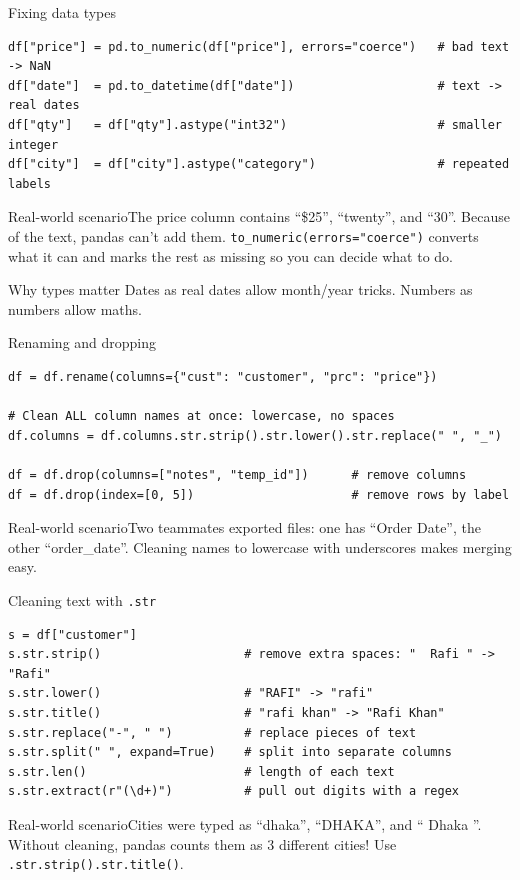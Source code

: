 \documentclass[aspectratio=169,10pt]{beamer}
\newcommand{\code}[1]{\texttt{#1}}
\newcommand{\scenario}[1]{\begin{exampleblock}{Real-world scenario}#1\end{exampleblock}}
\begin{document}
\begin{frame}[fragile]{Fixing data types}
\begin{lstlisting}
df["price"] = pd.to_numeric(df["price"], errors="coerce")   # bad text -> NaN
df["date"]  = pd.to_datetime(df["date"])                    # text -> real dates
df["qty"]   = df["qty"].astype("int32")                     # smaller integer
df["city"]  = df["city"].astype("category")                 # repeated labels
\end{lstlisting}
  \scenario{The price column contains ``\$25'', ``twenty'', and ``30''. Because of the text,
  pandas can't add them. \code{to\_numeric(errors="coerce")} converts what it can and marks
  the rest as missing so you can decide what to do.}
  \begin{block}{Why types matter}
    Dates as real dates allow month/year tricks. Numbers as numbers allow maths.
  \end{block}
\end{frame}

\begin{frame}[fragile]{Renaming and dropping}
\begin{lstlisting}
df = df.rename(columns={"cust": "customer", "prc": "price"})

# Clean ALL column names at once: lowercase, no spaces
df.columns = df.columns.str.strip().str.lower().str.replace(" ", "_")

df = df.drop(columns=["notes", "temp_id"])      # remove columns
df = df.drop(index=[0, 5])                      # remove rows by label
\end{lstlisting}
  \scenario{Two teammates exported files: one has ``Order Date'', the other ``order\_date''.
  Cleaning names to lowercase with underscores makes merging easy.}
\end{frame}

\begin{frame}[fragile]{Cleaning text with \texttt{.str}}
\begin{lstlisting}
s = df["customer"]
s.str.strip()                    # remove extra spaces: "  Rafi " -> "Rafi"
s.str.lower()                    # "RAFI" -> "rafi"
s.str.title()                    # "rafi khan" -> "Rafi Khan"
s.str.replace("-", " ")          # replace pieces of text
s.str.split(" ", expand=True)    # split into separate columns
s.str.len()                      # length of each text
s.str.extract(r"(\d+)")          # pull out digits with a regex
\end{lstlisting}
  \scenario{Cities were typed as ``dhaka'', ``DHAKA'', and `` Dhaka ''. Without cleaning,
  pandas counts them as 3 different cities! Use \code{.str.strip().str.title()}.}
\end{frame}
\end{document}
